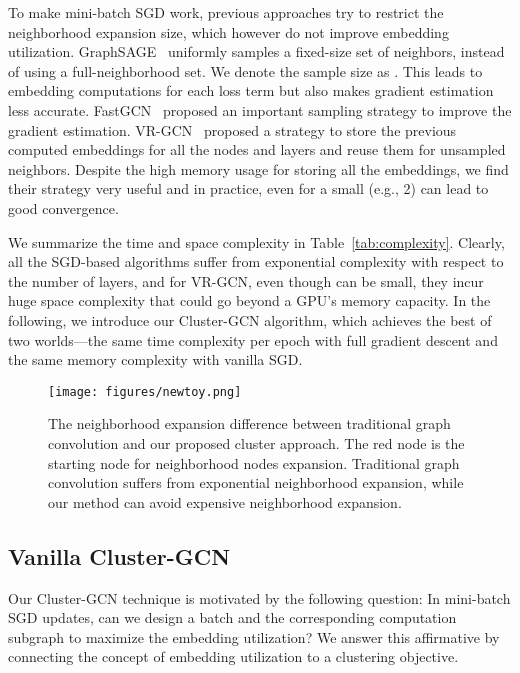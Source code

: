\documentclass[sigconf]{acmart}
\begin{document}
To make mini-batch SGD work, previous approaches try to restrict the neighborhood expansion size, which however do not improve embedding utilization.  GraphSAGE~\cite{hamilton2017inductive} 
 uniformly samples a fixed-size set of neighbors, instead of
using a full-neighborhood set. We denote the sample size as . This leads to  embedding computations for each loss term but also makes gradient estimation less accurate. 
FastGCN~\cite{chen2018fastgcn} proposed an important sampling strategy to improve the gradient estimation. VR-GCN~\cite{chen2018stochastic} proposed a strategy to store the previous computed embeddings for all the  nodes and  layers and reuse them for unsampled neighbors. Despite the high memory usage for storing all the  embeddings, we find their strategy very useful and in practice, even for a small  (e.g., 2) can lead to good convergence. 

We summarize the time and space complexity in Table~\ref{tab:complexity}. Clearly, all the SGD-based algorithms suffer from exponential complexity with respect to the number of layers, and for VR-GCN, even though  can be small, they incur huge space complexity that could go beyond a GPU's memory capacity. 
In the following, we introduce our Cluster-GCN algorithm, which achieves the best of two worlds---the same time complexity per epoch with full gradient descent and the same memory complexity with vanilla SGD. 





\begin{figure}
 \centering 
    \texttt{[image: figures/newtoy.png]}
    \caption{The neighborhood expansion difference between traditional
    graph convolution and our proposed cluster approach. The red node is the starting node for neighborhood nodes expansion. Traditional graph convolution suffers from exponential neighborhood expansion, while our method  can avoid expensive neighborhood expansion.}
    \label{fig:cluster}
    \vspace{-10pt}
\end{figure}
\subsection{Vanilla Cluster-GCN}

Our Cluster-GCN technique is motivated by the following question: In mini-batch SGD updates, can we design a batch and the corresponding computation subgraph  to maximize the embedding utilization? 
We answer this affirmative by connecting the concept of embedding utilization to a clustering objective. 
\end{document}
